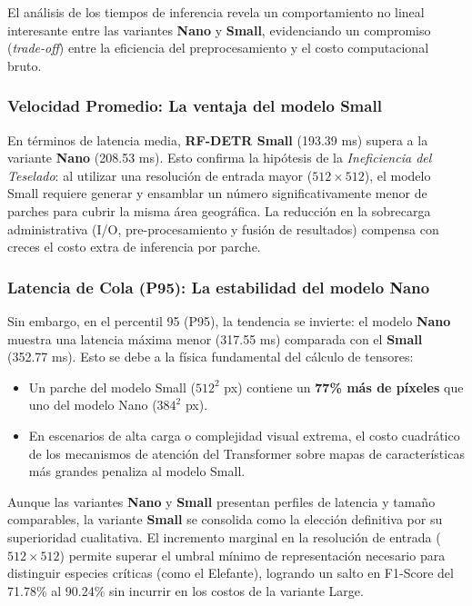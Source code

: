 El análisis de los tiempos de inferencia revela un comportamiento no lineal interesante entre las variantes \textbf{Nano} y \textbf{Small}, evidenciando un compromiso (\textit{trade-off}) entre la eficiencia del preprocesamiento y el costo computacional bruto.

\subsubsection{Velocidad Promedio: La ventaja del modelo Small}
En términos de latencia media, \textbf{RF-DETR Small} (193.39 ms) supera a la variante \textbf{Nano} (208.53 ms). Esto confirma la hipótesis de la \textit{Ineficiencia del Teselado}: al utilizar una resolución de entrada mayor ($512 \times 512$), el modelo Small requiere generar y ensamblar un número significativamente menor de parches para cubrir la misma área geográfica. La reducción en la sobrecarga administrativa (I/O, pre-procesamiento y fusión de resultados) compensa con creces el costo extra de inferencia por parche.

\subsubsection{Latencia de Cola (P95): La estabilidad del modelo Nano}
Sin embargo, en el percentil 95 (P95), la tendencia se invierte: el modelo \textbf{Nano} muestra una latencia máxima menor (317.55 ms) comparada con el \textbf{Small} (352.77 ms). Esto se debe a la física fundamental del cálculo de tensores:
\begin{itemize}
    \item Un parche del modelo Small ($512^2$ px) contiene un \textbf{77\% más de píxeles} que uno del modelo Nano ($384^2$ px).
    \item En escenarios de alta carga o complejidad visual extrema, el costo cuadrático de los mecanismos de atención del Transformer sobre mapas de características más grandes penaliza al modelo Small.
\end{itemize}

Aunque las variantes \textbf{Nano} y \textbf{Small} presentan perfiles de latencia y tamaño comparables, la variante \textbf{Small} se consolida como la elección definitiva por su superioridad cualitativa. El incremento marginal en la resolución de entrada ($512 \times 512$) permite superar el umbral mínimo de representación necesario para distinguir especies críticas (como el Elefante), logrando un salto en F1-Score del 71.78\% al 90.24\% sin incurrir en los costos de la variante Large.


